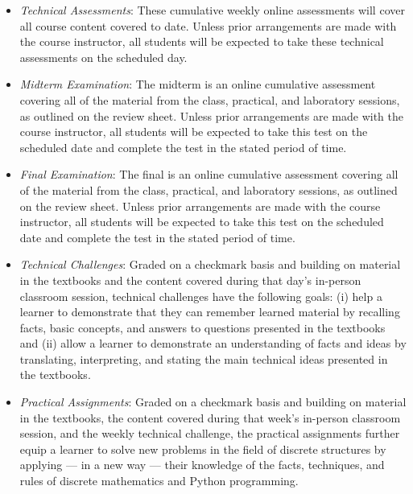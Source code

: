 \documentclass[11pt]{article}
\begin{document}
\begin{itemize}

  \item {\em Technical Assessments\/}: These cumulative weekly online
    assessments will cover all course content covered to date. Unless prior
    arrangements are made with the course instructor, all students will be
    expected to take these technical assessments on the scheduled day.

  \item {\em Midterm Examination\/}: The midterm is an online cumulative
    assessment covering all of the material from the class, practical, and
    laboratory sessions, as outlined on the review sheet. Unless prior
    arrangements are made with the course instructor, all students will be
    expected to take this test on the scheduled date and complete the test in
    the stated period of time.

  \item {\em Final Examination\/}: The final is an online cumulative assessment
    covering all of the material from the class, practical, and laboratory
    sessions, as outlined on the review sheet. Unless prior arrangements are
    made with the course instructor, all students will be expected to take this
    test on the scheduled date and complete the test in the stated period of
    time.

  \item {\em Technical Challenges\/}: Graded on a checkmark basis and building
    on material in the textbooks and the content covered during that day's
    in-person classroom session, technical challenges have the following goals:
    (i) help a learner to demonstrate that they can remember learned material
    by recalling facts, basic concepts, and answers to questions presented in
    the textbooks and (ii) allow a learner to demonstrate an understanding of
    facts and ideas by translating, interpreting, and stating the main
    technical ideas presented in the textbooks.

  \item {\em Practical Assignments\/}: Graded on a checkmark basis and building
    on material in the textbooks, the content covered during that week's
    in-person classroom session, and the weekly technical challenge, the
    practical assignments further equip a learner to solve new problems in the
    field of discrete structures by applying --- in a new way --- their
    knowledge of the facts, techniques, and rules of discrete mathematics and
    Python programming.


\end{itemize}
\end{document}
